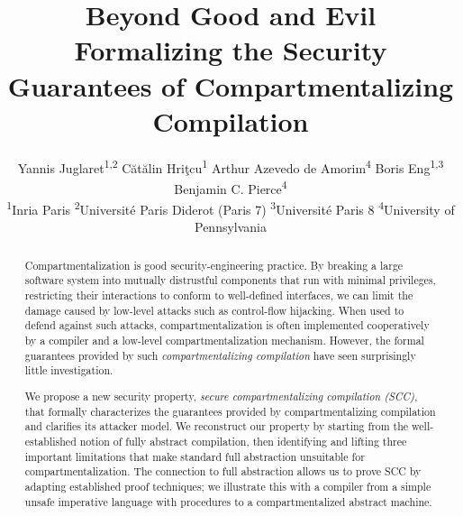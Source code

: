\documentclass[10pt, conference, compsocconf, letterpaper, times]{IEEEtran}
\begin{document}
\title{{\Huge\bf Beyond Good and Evil}
\\[1ex]
\Large\bf Formalizing the Security Guarantees of Compartmentalizing Compilation}

\author{
\ifanon
\else
  Yannis Juglaret\textsuperscript{1,2} \quad C\u{a}t\u{a}lin Hri\c{t}cu\textsuperscript{1} \quad Arthur Azevedo de Amorim\textsuperscript{4} \quad Boris Eng\textsuperscript{1,3} \quad Benjamin C. Pierce\textsuperscript{4} \\[1ex] \textsuperscript{1}Inria Paris\qquad
  \textsuperscript{2}Universit\'{e} Paris Diderot (Paris 7)\qquad
  \textsuperscript{3}Universit\'{e} Paris 8\qquad
  \textsuperscript{4}University of Pennsylvania
\fi
}

\maketitle

\begin{abstract}
Compartmentalization is good security-engineering practice. By
breaking a large software system into mutually distrustful components
that run with minimal privileges, restricting their interactions to
conform to well-defined interfaces, we can limit the damage caused by
low-level attacks such as control-flow hijacking.  When used to defend
against such attacks, compartmentalization is often implemented
cooperatively by a compiler and a low-level compartmentalization
mechanism. However, the formal guarantees provided by such {\em
  compartmentalizing compilation} have seen surprisingly little
investigation.

We propose a new security property, \emph{secure compartmentalizing
  compilation (SCC)}, that formally characterizes the guarantees
provided by compartmentalizing compilation and clarifies its attacker
model. We reconstruct our property by starting from the
well-established notion of fully abstract compilation, then
identifying and lifting three important limitations that make standard
full abstraction unsuitable for compartmentalization. The connection
to full abstraction allows us to prove SCC by adapting established
proof techniques; we illustrate this with a compiler from a simple
unsafe imperative language with procedures to a compartmentalized
abstract machine.
\end{abstract}

\ifsooner
{}
\fi
\end{document}
